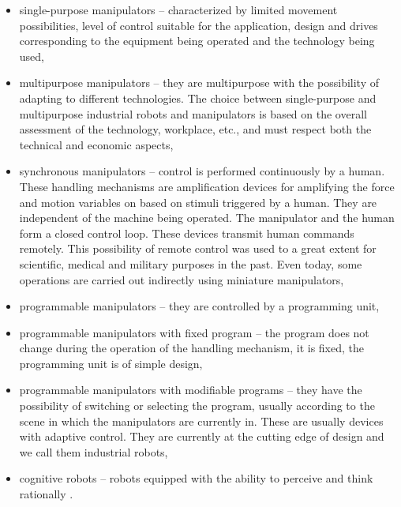 \begin{itemize}

    \item  single-purpose manipulators -- characterized by limited movement possibilities, level of control suitable for the application, design and drives corresponding to the equipment being operated and the technology being used, 

    \item multipurpose manipulators -- they are multipurpose with the possibility of adapting to different technologies. The choice between single-purpose and multipurpose industrial robots and manipulators is based on the overall assessment of the technology, workplace, etc., and must respect both the technical and economic aspects,

    \item  synchronous manipulators -- control is performed continuously by a human. These handling mechanisms are amplification devices for amplifying the force and motion variables on based on stimuli triggered by a human. They are independent of the machine being operated. The manipulator and the human form a closed control loop. These devices transmit human commands remotely. This possibility of remote control was used to a great extent for scientific, medical and military purposes in the past. Even today, some operations are carried out indirectly using miniature manipulators, 

    \item  programmable manipulators -- they are controlled by a programming unit,

    \item  programmable manipulators with fixed program -- the program does not change during the operation of the handling mechanism, it is fixed, the programming unit is of simple design, 

    \item  programmable manipulators with modifiable programs -- they have the possibility of switching or selecting the program, usually according to the scene in which the manipulators are currently in. These are usually devices with adaptive control. They are currently at the cutting edge of design and we call them industrial robots,

    \item  cognitive robots -- robots equipped with the ability to perceive and think rationally \cite{vsb_2007}.

\end{itemize}

